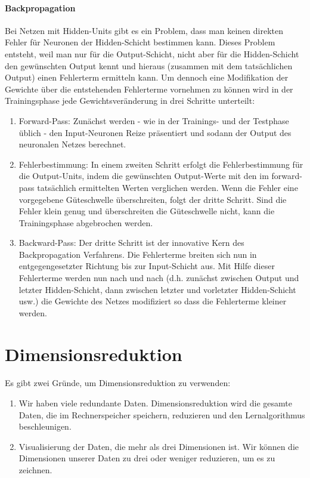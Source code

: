 \paragraph{Backpropagation\\}
Bei Netzen mit Hidden-Units gibt es ein Problem, dass man keinen direkten Fehler f\"ur Neuronen der Hidden-Schicht bestimmen kann. Dieses Problem entsteht, weil man nur f\"ur die Output-Schicht, nicht aber f\"ur die Hidden-Schicht den gew\"unschten Output kennt und hieraus (zusammen mit dem tats\"achlichen Output) einen Fehlerterm ermitteln kann. Um dennoch eine Modifikation der Gewichte \"uber die entstehenden Fehlerterme vornehmen zu k\"onnen wird in der Trainingsphase jede Gewichtsver\"anderung in drei Schritte unterteilt:
\begin{enumerate}
\item Forward-Pass: Zun\"achst werden - wie in der Trainings- und der Testphase \"ublich - den Input-Neuronen Reize pr\"asentiert und sodann der Output des neuronalen Netzes berechnet.
\item Fehlerbestimmung: In einem zweiten Schritt erfolgt die Fehlerbestimmung f\"ur die Output-Units, indem die gew\"unschten Output-Werte mit den im forward-pass tats\"achlich ermittelten Werten verglichen werden. Wenn die Fehler eine vorgegebene G\"uteschwelle \"uberschreiten, folgt der dritte Schritt. Sind die Fehler klein genug und \"uberschreiten die G\"uteschwelle nicht, kann die Trainingsphase abgebrochen werden.
\item Backward-Pass: Der dritte Schritt ist der innovative Kern des Backpropagation Verfahrens. Die Fehlerterme breiten sich nun in entgegengesetzter Richtung bis zur Input-Schicht aus. Mit Hilfe dieser Fehlerterme werden nun nach und nach (d.h. zun\"achst zwischen Output und letzter Hidden-Schicht, dann zwischen letzter und vorletzter Hidden-Schicht usw.) die Gewichte des Netzes modifiziert so dass die Fehlerterme kleiner werden.
\end{enumerate}

\section{Dimensionsreduktion}

\paragraph{}
Es gibt zwei Gr\"unde, um Dimensionsreduktion zu verwenden:

\begin{enumerate}
\item Wir haben viele redundante Daten. Dimensionsreduktion wird die gesamte Daten, die im Rechnerspeicher speichern, reduzieren und den Lernalgorithmus beschleunigen.
\item Visualisierung der Daten, die mehr als drei Dimensionen ist. Wir k\"onnen die Dimensionen unserer Daten zu drei oder weniger reduzieren, um es zu zeichnen.
\end{enumerate}

